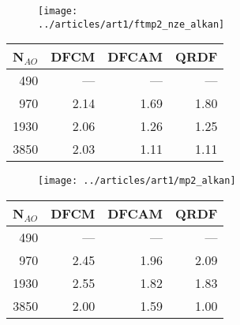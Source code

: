 \begin{figure}[htp]

\begin{subfigure}{\textwidth}
\begin{subfigure}{0.45\textwidth}
\texttt{[image: ../articles/art1/ftmp2\_nze\_alkan]}
\end{subfigure}
\hfill
\begin{subtable}{0.45\textwidth}
\begin{tabular}{rrrr}
\hline
N$_{AO}$ & DFCM & DFCAM & QRDF \\ \hline
490 & --- & --- 	& --- \\ 
970	& 2.14 & 1.69 & 1.80 \\
1930	 & 2.06 & 1.26 & 1.25 \\
3850	 & 2.03 & 1.11 & 1.11 \\
 \hline
\end{tabular}
\end{subtable}
\caption{}
\label{fig:GS_ZMEM_LA}
\end{subfigure}

\vspace{1.5\baselineskip}

\begin{subfigure}{\textwidth}
\begin{subfigure}{0.45\textwidth}
\centering
\texttt{[image: ../articles/art1/mp2\_alkan]}
\end{subfigure}
\hfill
\begin{subtable}{0.45\textwidth}
\centering
\begin{tabular}{rrrr}
\hline
N$_{AO}$ & DFCM & DFCAM & QRDF \\ \hline
490 & --- & --- 	& --- \\ 
970	& 2.45 & 1.96 & 2.09 \\
1930	 & 2.55 & 1.82 & 1.83 \\
3850	 & 2.00 & 1.59 & 1.00 \\
 \hline
\end{tabular}
\end{subtable}
\caption{}
\label{fig:GS_ZSCALE_LA}
\end{subfigure}

\vspace{1.5\baselineskip}


\end{figure}
